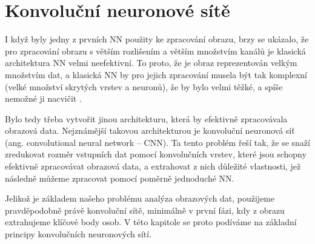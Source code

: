 \chapter{Konvoluční neuronové sítě}
\label{chap:CNN}

I když byly jedny z prvních NN použity ke zpracování obrazu, brzy se ukázalo,
že pro zpracování obrazu s větším rozlišením a větším množstvím kanálů je
klasická architektura NN velmi neefektivní. To proto, že je obraz reprezentován
velkým množstvím dat, a klasická NN by pro jejich zpracování musela být tak
komplexní (velké množství skrytých vrstev a neuronů), že by bylo velmi těžké, a
spíše nemožné ji nacvičit \cite{cnn_introduction}.

Bylo tedy třeba vytvořit jinou architekturu, která by efektivně zpracovávala
obrazová data. Nejznámější takovou architekturou je konvoluční neuronová síť
(ang. convolutional neural network – CNN). Ta tento problém řeší tak, že se
snaží zredukovat rozměr vstupních dat pomocí konvolučních vrstev, které jsou
schopny efektivně zpracovávat obrazová data, a extrahovat z nich důležité
vlastnosti, jež následně můžeme zpracovat pomocí poměrně jednoduché NN.

Jelikož je základem našeho problému analýza obrazových dat, použijeme
pravděpodobně právě konvoluční sítě, minimálně v první fázi, kdy z obrazu
extrahujeme klíčové body osob. V této kapitole se proto podíváme na základní
principy konvolučních neuronových sítí.




